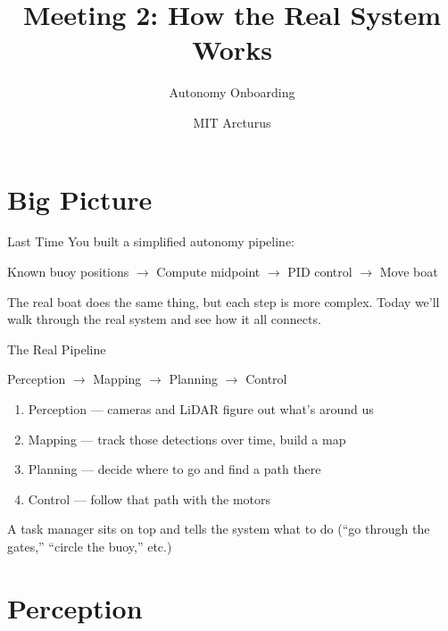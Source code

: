 \documentclass[aspectratio=169]{beamer}
\title{Meeting 2: How the Real System Works}
\subtitle{Autonomy Onboarding}
\author{MIT Arcturus}
\date{}
\begin{document}
\begin{frame}
    \titlepage
\end{frame}

\section{Big Picture}

\begin{frame}{Last Time}
    You built a simplified autonomy pipeline:
    \vfill
    \begin{center}
        Known buoy positions $\rightarrow$ Compute midpoint $\rightarrow$ PID control $\rightarrow$ Move boat
    \end{center}
    \vfill
    The real boat does the same thing, but each step is more complex.
    \vfill
    Today we'll walk through the real system and see how it all connects.
\end{frame}

\begin{frame}{The Real Pipeline}
    \begin{center}
        \Large
        Perception $\rightarrow$ Mapping $\rightarrow$ Planning $\rightarrow$ Control
    \end{center}
    \vfill
    \begin{enumerate}
        \item Perception --- cameras and LiDAR figure out what's around us
        \item Mapping --- track those detections over time, build a map
        \item Planning --- decide where to go and find a path there
        \item Control --- follow that path with the motors
    \end{enumerate}
    \vfill
    A task manager sits on top and tells the system what to do (``go through the gates,'' ``circle the buoy,'' etc.)
\end{frame}

\section{Perception}
\end{document}
